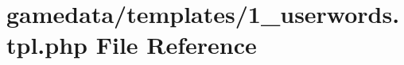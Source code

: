 \hypertarget{1__userwords_8tpl_8php}{\section{gamedata/templates/1\+\_\+userwords.tpl.\+php File Reference}
\label{1__userwords_8tpl_8php}
}
